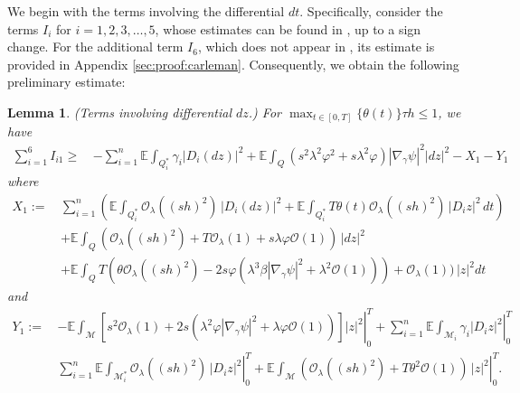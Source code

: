 \documentclass[11pt,oneside,leqno]{amsart}
\numberwithin{equation}{section}
\numberwithin{equation}{section}
\newcommand{\E}{\mathbb{E}}
\newtheorem{lemma}[theorem]{Lemma}
\begin{document}
We begin with the terms involving the differential $dt$. Specifically, consider the terms $I_i$ for $i=1,2,3,\dots,5$, whose estimates can be found in \cite{LPP:2025}, up to a sign change. For the additional term $I_6$, which does not appear in \cite{LPP:2025}, its estimate is provided in Appendix \ref{sec:proof:carleman}. Consequently, we obtain the following preliminary estimate:
\begin{lemma}\label{lem:dz}
(\textit{Terms involving differential $dz$.}) For $\displaystyle \max_{t\in[0,T]}\{\theta(t)\}\tau h\leq 1$, we have
\begin{equation*}
\begin{split}
    \sum_{i=1}^{6}I_{i1}\geq\,&-\sum_{i=1}^{n} \E\int_{Q_i^{\ast}}\gamma_i|D_i(dz)|^2+\E\int_{Q}(s^2\lambda^2\varphi^2+s\lambda^2\varphi)|\nabla_{\gamma} \psi|^2|dz|^2-X_{1}-Y_{1}
\end{split}
\end{equation*}
where
\begin{equation*}
\begin{split}
    X_{1}:=\,&\sum_{i=1}^{n}\left(\E\int_{Q_{i}^{\ast}}\mathcal{O}_{\lambda}((sh)^2)\,|D_i(dz)|^2+\E\int_{Q_{i}^{\ast}}T\theta(t)\mathcal{O}_{\lambda}((sh)^2)\,|D_iz|^2\,dt\right)\\
    &+\E\int_{Q}(\mathcal{O}_{\lambda}((sh)^2)+T\mathcal{O}_{\lambda}(1)+s\lambda\varphi\mathcal{O}(1))\,|dz|^2\\
    &+\E\int_{Q} T(\theta\mathcal{O}_{\lambda}((sh)^2)-2s\varphi(\lambda^3\beta|\nabla_{\gamma}\psi|^2+\lambda^2\mathcal{O}(1)))+\mathcal{O}_{\lambda}(1))\,|z|^2dt
\end{split}
\end{equation*}
and
\begin{equation*}
\begin{split}
    Y_{1}:=\,&-\left.\E\int_{\mathcal{M}}[s^2\mathcal{O}_{\lambda}(1)+2s(\lambda^2\varphi|\nabla_{\gamma}\psi|^2+\lambda\varphi\mathcal{O}(1))]|z|^2\right|_0^T+\sum_{i=1}^{n}\left.\E\int_{\mathcal{M}_{i}}\gamma_i|D_iz|^2\right|_0^T\\
    &\sum_{i=1}^{n}\E\left. \int_{\mathcal{M}_i^*}\mathcal{O}_{\lambda}((sh)^2)\,|D_iz|^2\right|_0^T+\E\left.\int_{\mathcal{M}}(\mathcal{O}_{\lambda}((sh)^2)+T\theta^2\mathcal{O}(1))\,|z|^2\right|_0^T.
\end{split}
\end{equation*}
\end{lemma}
\end{document}
